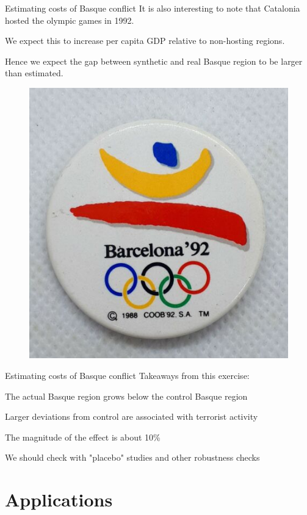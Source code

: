 \documentclass[notes,11pt, aspectratio=169]{beamer}
\newenvironment{wideitemize}{\itemize\addtolength{\itemsep}{10pt}}{\enditemize}
\begin{document}
\begin{frame}{Estimating costs of Basque conflict}
    It is also interesting to note that Catalonia hosted the olympic games in 1992. \medskip 
    \begin{wideitemize}
        \item We expect this to increase per capita GDP relative to non-hosting regions.
        \item Hence we expect the gap between synthetic and real Basque region to be larger than estimated. 
    \end{wideitemize}

        \begin{figure}
    \centering
        \includegraphics[width = .2\linewidth]{figures/barcelona_olympics.png}
        \label{fig:olympics}
    \end{figure}
    
\end{frame}

\begin{frame}{Estimating costs of Basque conflict}
    Takeaways from this exercise: \medskip 
    \begin{wideitemize}
        \item The actual Basque region grows below the control Basque region
        \item Larger deviations from control are associated with terrorist activity
        \item The magnitude of the effect is about 10\%
        \item We should check with "placebo" studies and other robustness checks
    \end{wideitemize}
\end{frame}

\section{Applications}
\end{document}
